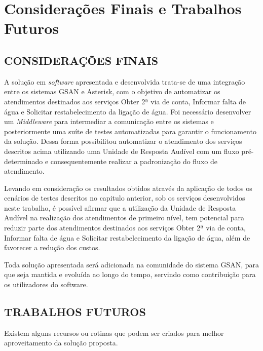 \chapter[Considerações Finais e Trabalhos Futuros]{Considerações Finais e Trabalhos Futuros}

\section{\textbf{\uppercase{Considerações Finais}}}
A solução em \textit{software} apresentada e desenvolvida trata-se de uma integração entre os sistemas GSAN e Asterisk, com o objetivo de automatizar os atendimentos destinados aos serviços Obter 2ª via de conta, Informar falta de água e Solicitar restabelecimento da ligação de água. Foi necessário desenvolver um \textit{Middleware} para intermediar a comunicação entre os sistemas e posteriormente uma suíte de testes automatizadas para garantir o funcionamento da solução. Dessa forma possibilitou automatizar o atendimento dos serviços descritos acima utilizando uma Unidade de Resposta Audível com um fluxo pré-determinado e consequentemente realizar a padronização do fluxo de atendimento.

Levando em consideração os resultados obtidos através da aplicação de todos os cenários de testes descritos no capitulo anterior, sob os serviços desenvolvidos neste trabalho, é possível afirmar que a utilização da Unidade de Resposta Audível na realização dos atendimentos de primeiro nível, tem potencial para reduzir parte dos atendimentos destinados aos serviços Obter 2ª via de conta, Informar falta de água e Solicitar restabelecimento da ligação de água, além de favorecer a redução dos custos.

Toda solução apresentada será adicionada na comunidade do sistema GSAN, para que seja mantida e evoluída ao longo do tempo, servindo como contribuição para os utilizadores do software.

\section{\textbf{\uppercase{Trabalhos Futuros}}}

Existem alguns recursos ou rotinas que podem ser criados para melhor aproveitamento da solução proposta.

